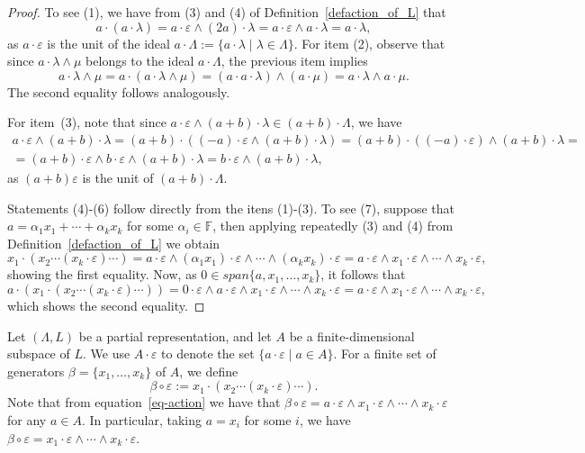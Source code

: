 \documentclass{amsart}
\newcommand{\F}{\mathbb{F}}
\newcommand{\0}{{\vartheta}}
\theoremstyle{definition}
\theoremstyle{remark}
\numberwithin{equation}{section}
\newtheorem*{Theorem A}{\textbf{Theorem A}}
\newtheorem*{Corollary E}{\textbf{Corollary E}}
\newtheorem*{Corollary F}{\textbf{Corollary F}}
\newtheorem*{Theorem B}{\textbf{Theorem B}}
\newtheorem*{Theorem C}{\textbf{Theorem C}}
\newtheorem*{Theorem D}{\textbf{Theorem B}}
\newtheorem*{p a}{\textbf{Proof of  Theorem A}}
\newtheorem*{p b}{\textbf{Proof of Theorem B}}
\newtheorem*{p c}{\textbf{Proof of  Theorem C}}
\newtheorem*{p d}{\textbf{Proof of  Theorem D}}
\begin{document}
\begin{proof}
To see (1),  we have  from (3) and (4) of Definition~\ref{defaction_of_L} that
$$a\cdot(a\cdot \lambda)=a\cdot\varepsilon\wedge (2a)\cdot \lambda=a\cdot\varepsilon\wedge a\cdot \lambda=a\cdot \lambda,$$
as $a\cdot \varepsilon$ is the unit of the ideal $a\cdot\Lambda:=\{a\cdot \lambda\mid \lambda\in \Lambda\}.$  For item (2), observe that since $a \cdot\lambda \wedge \mu$ belongs to the ideal $a \cdot \Lambda$, the previous item implies  
$$
a \cdot \lambda \wedge \mu = a \cdot (a \cdot \lambda \wedge \mu) = (a \cdot a \cdot \lambda) \wedge (a \cdot \mu) = a \cdot \lambda \wedge a \cdot \mu.
$$ 
The second equality follows analogously.

For item~(3), note that since $a\cdot\varepsilon \wedge (a+b)\cdot\lambda\in (a+b)\cdot \Lambda$, we have
\begin{multline*}
a\cdot\varepsilon \wedge (a+b)\cdot\lambda =(a+b)\cdot((-a)\cdot\varepsilon \wedge (a+b)\cdot\lambda)=(a+b)\cdot( (-a)\cdot\varepsilon) \wedge (a+b)\cdot\lambda=\\
=(a+b)\cdot \varepsilon\wedge b\cdot \varepsilon\wedge (a+b)\cdot \lambda= b\cdot \varepsilon\wedge (a+b)\cdot \lambda,
\end{multline*}
as $(a+b)\varepsilon$ is the unit of $(a+b)\cdot \Lambda.$

Statements (4)-(6) follow directly from the itens (1)-(3). To see (7), suppose that $a=\alpha_1x_1+\cdots +\alpha_kx_k$ for some $\alpha_i\in \F$, then applying  repeatedly  (3) and (4) from Definition~\ref{defaction_of_L} we obtain 
$$x_1\cdot(x_2\cdots(x_k\cdot \varepsilon  )\cdots )=a\cdot \varepsilon\wedge (\alpha_1x_1)\cdot\varepsilon\wedge\cdots \wedge (\alpha_kx_k)\cdot \varepsilon=a\cdot \varepsilon\wedge x_1\cdot\varepsilon\wedge\cdots \wedge x_k\cdot \varepsilon,$$
showing the first equality. Now, as $0\in span\{a,x_1,\ldots,x_k\}$, it follows that 
$$a\cdot(x_1\cdot(x_2\cdots(x_k\cdot \varepsilon  ) \cdots ))=0\cdot\varepsilon\wedge a\cdot \varepsilon\wedge x_1\cdot\varepsilon\wedge\cdots \wedge x_k\cdot \varepsilon=a\cdot \varepsilon\wedge x_1\cdot\varepsilon\wedge\cdots \wedge x_k\cdot \varepsilon,$$
which shows the second equality.
\end{proof}


Let $(\Lambda,L)$ be a partial representation, and let $A$ be a finite-dimensional subspace of $L$. We use  $A\cdot \varepsilon$ to denote the set $\{a\cdot \varepsilon\mid a\in A\}$. For a  finite set of generators  $\beta=\{x_1,\ldots,x_k\}$ of $A$, we define  $$\beta\circ \varepsilon:=x_1\cdot(x_2\cdots(x_k\cdot \varepsilon )\cdots ).$$ Note that from equation~\eqref{eq-action} we have that $\beta\circ\varepsilon=a\cdot \varepsilon\wedge x_1\cdot\varepsilon\wedge\cdots \wedge x_k\cdot \varepsilon$ for any $a\in A$. In particular, taking $a=x_i$ for some $i$, we have $\beta\circ \varepsilon=x_1\cdot\varepsilon\wedge\cdots \wedge x_k\cdot \varepsilon$.
\end{document}

